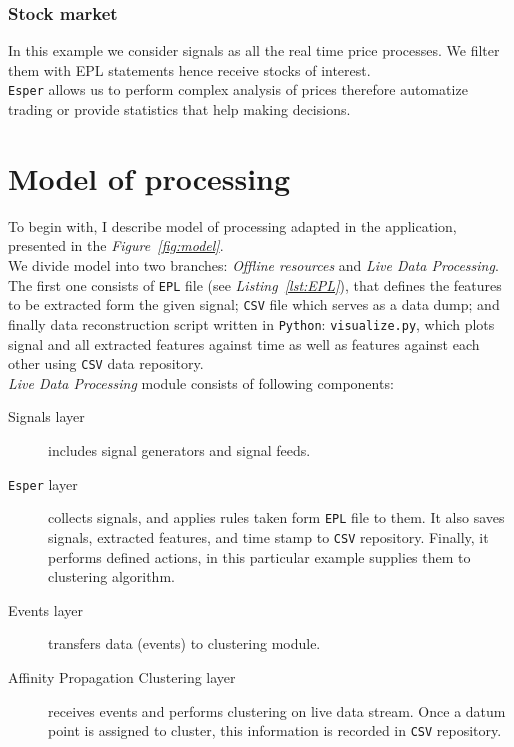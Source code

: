 \documentclass[11pt, letterpaper]{article}            %
\begin{document}
\subsubsection{Stock market}
In this example we consider signals as all the real time price processes. We filter them with EPL statements hence receive stocks of interest.\\
\texttt{Esper} allows us to perform complex analysis of prices therefore automatize trading or provide statistics that help making decisions.


\section{Model of processing}
To begin with, I describe model of processing adapted in the application, presented in the \textit{Figure~\ref{fig:model}}.\\
We divide model into two branches: \emph{Offline resources} and \emph{Live Data Processing}. The first one consists of \texttt{EPL} file (see \textit{Listing~\ref{lst:EPL}}), that defines the features to be extracted form the given signal; \texttt{CSV} file which serves as a data dump; and finally data reconstruction script written in \texttt{Python}: \texttt{visualize.py}, which plots signal and all extracted features against time as well as features against each other using \texttt{CSV} data repository.\\
\emph{Live Data Processing} module consists of following components:
\begin{description}
    \item[Signals layer] includes signal generators and signal feeds.
    \item[\texttt{Esper} layer] collects signals, and applies rules taken form \texttt{EPL} file to them. It also saves signals, extracted features, and time stamp to \texttt{CSV} repository. Finally, it performs defined actions, in this particular example supplies them to clustering algorithm.
    \item[Events layer] transfers data (events) to clustering module.
    \item[Affinity Propagation Clustering layer] receives events and performs clustering on live data stream. Once a datum point is assigned to cluster, this information is recorded in \texttt{CSV} repository.
\end{description}
\end{document}
